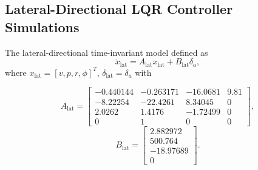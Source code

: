 \documentclass[10pt]{article}
\begin{document}
\subsection{Lateral-Directional LQR Controller Simulations}

The lateral-directional 
time-invariant model defined as
\begin{equation}
    \dot{x}_{\mathrm{lat}}
    =
    A_{\mathrm{lat}}x_{\mathrm{lat}}
    +
    B_{\mathrm{lat}}\delta_a,
\end{equation}
where $x_{\mathrm{lat}} =[v, p, r, \phi]^T$, $\delta_{\mathrm{lat}} = \delta_a$ with 

\begin{equation}
A_{\mathrm{lat}} =
\begin{bmatrix}
-0.440144 & -0.263171 & -16.0681 & 9.81\\
-8.22254  & -22.4261  &  8.34045 & 0\\
 2.0262   &  1.4176   & -1.72499 & 0\\
 0        &  1        &  0       & 0
\end{bmatrix},
\end{equation}
\begin{equation}
B_{\mathrm{lat}} =
\begin{bmatrix}
2.882972\\
500.764\\
-18.97689\\
0
\end{bmatrix}.
\end{equation}
\end{document}
